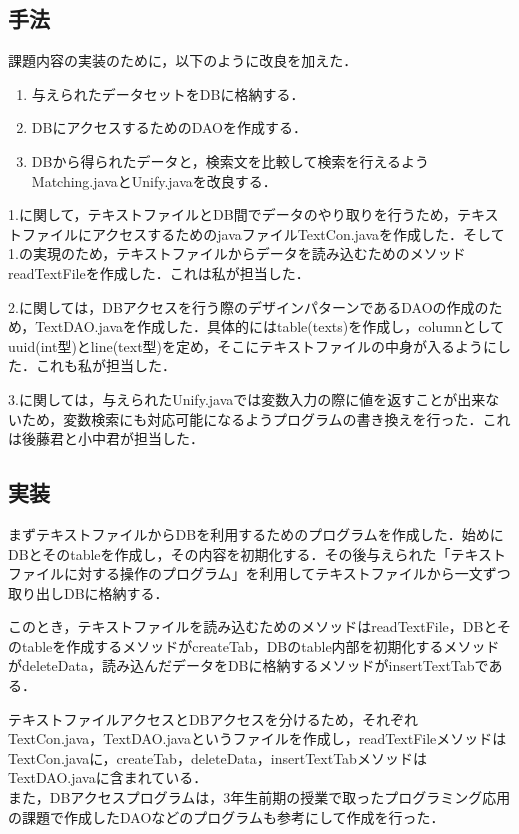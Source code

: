 \documentclass[12pt]{jarticle}
\begin{document}
\subsection{手法}
課題内容の実装のために，以下のように改良を加えた．

\begin{enumerate}
\item 与えられたデータセットをDBに格納する．
\item DBにアクセスするためのDAOを作成する．
\item DBから得られたデータと，検索文を比較して検索を行えるようMatching.javaとUnify.javaを改良する．
\end{enumerate}

1.に関して，テキストファイルとDB間でデータのやり取りを行うため，テキストファイルにアクセスするためのjavaファイルTextCon.javaを作成した．そして1.の実現のため，テキストファイルからデータを読み込むためのメソッドreadTextFileを作成した．これは私が担当した．

2.に関しては，DBアクセスを行う際のデザインパターンであるDAOの作成のため，TextDAO.javaを作成した．具体的にはtable(texts)を作成し，columnとしてuuid(int型)とline(text型)を定め，そこにテキストファイルの中身が入るようにした．これも私が担当した．

3.に関しては，与えられたUnify.javaでは変数入力の際に値を返すことが出来ないため，変数検索にも対応可能になるようプログラムの書き換えを行った．これは後藤君と小中君が担当した．

\subsection{実装}
まずテキストファイルからDBを利用するためのプログラムを作成した．始めにDBとそのtableを作成し，その内容を初期化する．その後与えられた「テキストファイルに対する操作のプログラム」を利用してテキストファイルから一文ずつ取り出しDBに格納する．\par
このとき，テキストファイルを読み込むためのメソッドはreadTextFile，DBとそのtableを作成するメソッドがcreateTab，DBのtable内部を初期化するメソッドがdeleteData，読み込んだデータをDBに格納するメソッドがinsertTextTabである．\par
テキストファイルアクセスとDBアクセスを分けるため，それぞれTextCon.java，TextDAO.javaというファイルを作成し，readTextFileメソッドはTextCon.javaに，createTab，deleteData，insertTextTabメソッドはTextDAO.javaに含まれている．\\

また，DBアクセスプログラムは，3年生前期の授業で取ったプログラミング応用の課題で作成したDAOなどのプログラムも参考にして作成を行った．\\
\end{document}

